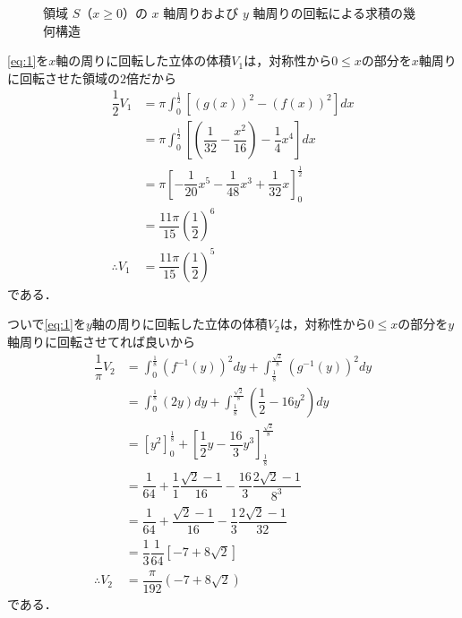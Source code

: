 \documentclass[../../main.tex]{subfiles}
\begin{document}
\begin{figure}[htb]
  \caption{領域 $S$（$x \ge 0$）の $x$ 軸周りおよび $y$ 軸周りの回転による求積の幾何構造}
  \label{fig:rotation_swept_volume_both_axes}
\end{figure}

\cref{eq:1}を$x$軸の周りに回転した立体の体積$V_1$は，対称性から$0\le x$の部分を$x$軸周りに回転させた領域の$2$倍だから
\begin{align}
  \dfrac{1}{2} V_1
  &= \pi \int_0^{\frac{1}{2}} \left[(g(x))^2-(f(x))^2\right] dx \\
  &= \pi \int_0^{\frac{1}{2}} \left[ \left( \dfrac{1}{32} - \dfrac{x^2}{16} \right) - \dfrac{1}{4} x^4 \right] dx \\
  &= \pi \left[ -\dfrac{1}{20} x^5 - \dfrac{1}{48} x^3 + \dfrac{1}{32} x \right]_0^{\frac{1}{2}} \\
  &= \dfrac{11\pi}{15} \left(\dfrac{1}{2}\right)^6 \\
  \therefore
  V_1 &= \dfrac{11\pi}{15} \left(\dfrac{1}{2}\right)^5 \label{eq:4}
\end{align}
である．

ついで\cref{eq:1}を$y$軸の周りに回転した立体の体積$V_2$は，対称性から$0\le x$の部分を$y$軸周りに回転させてれば良いから
\begin{align}
  \dfrac{1}{\pi} V_2
  &= \int_0^{\frac{1}{8}} \left(f^{-1}(y)\right)^2 dy
  + \int_{\frac{1}{8}}^{\frac{\sqrt{2}}{8}} \left(g^{-1}(y)\right)^2 dy \\
  &= \int_0^{\frac{1}{8}} (2y) dy + \int_{\frac{1}{8}}^{\frac{\sqrt{2}}{8}} \left( \dfrac{1}{2} - 16y^2 \right) dy \\
  &= \left[ y^2 \right]_0^{\frac{1}{8}} + \left[ \dfrac{1}{2} y - \dfrac{16}{3} y^3 \right]_{\frac{1}{8}}^{\frac{\sqrt{2}}{8}} \\
  &= \dfrac{1}{64} + \dfrac{1}{1}\dfrac{\sqrt{2}-1}{16} - \dfrac{16}{3} \dfrac{2\sqrt{2}-1}{8^3} \\
  &= \dfrac{1}{64} + \dfrac{\sqrt{2}-1}{16} - \dfrac{1}{3} \dfrac{2\sqrt{2}-1}{32} \\
  &= \dfrac{1}{3} \dfrac{1}{64} \left[ -7 + 8\sqrt{2} \right] \\
  \therefore
  V_2 &= \dfrac{\pi}{192} (-7 + 8\sqrt{2}) \label{eq:5}
\end{align}
である．
\end{document}
